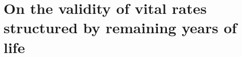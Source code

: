     \section{On the validity of vital rates structured by remaining years of
    life}
      
\startappendices

 \label{app:Appendix1}
 
 
 
 
 
 
 \nocite{*} %
\startbibliography
 \begin{singlespace} %
 \end{singlespace}


